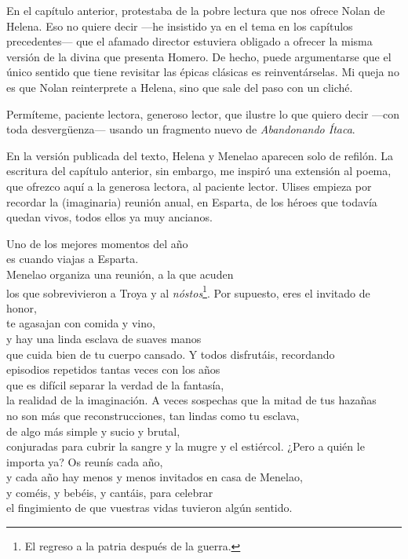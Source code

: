 \label{cap:menelao}

En el capítulo anterior, protestaba de la pobre lectura que nos ofrece Nolan de Helena. Eso no quiere decir ---he insistido ya en el tema en los capítulos precedentes--- que el afamado director estuviera obligado a ofrecer la misma versión de la divina que presenta Homero. De hecho, puede argumentarse que el único sentido que tiene revisitar las épicas clásicas es reinventárselas. Mi queja no es que Nolan reinterprete a Helena, sino que sale del paso con un cliché.

Permíteme, paciente lectora, generoso lector, que ilustre lo que quiero decir ---con toda desvergüenza--- usando un fragmento nuevo de \emph{Abandonando Ítaca}.

En la versión publicada del texto, Helena y Menelao aparecen solo de refilón. La escritura del capítulo anterior, sin embargo, me inspiró una extensión al poema, que ofrezco aquí a la generosa lectora, al paciente lector. Ulises empieza por recordar la (imaginaria) reunión anual, en Esparta, de los héroes que todavía quedan vivos, todos ellos ya muy ancianos.

\begin{versopropio}
Uno de los mejores momentos del año\\
es cuando viajas a Esparta.\\
Menelao organiza una reunión, a la que acuden\\
los que sobrevivieron a Troya y al \emph{nóstos}\footnote{El regreso a la patria después de la guerra.}.
\stanzabreak
Por supuesto, eres el invitado de honor,\\
te agasajan con comida y vino,\\
y hay una linda esclava de suaves manos\\
que cuida bien de tu cuerpo cansado.
\stanzabreak
Y todos disfrutáis, recordando\\
episodios repetidos tantas veces con los años\\
que es difícil separar la verdad de la fantasía,\\
la realidad de la imaginación.
\stanzabreak
A veces sospechas que la mitad de tus hazañas\\
no son más que reconstrucciones, tan lindas como tu esclava,\\
de algo más simple y sucio y brutal,\\
conjuradas para cubrir la sangre y la mugre y el estiércol.
\stanzabreak
¿Pero a quién le importa ya? Os reunís cada año,\\
y cada año hay menos y menos invitados en casa de Menelao,\\
y coméis, y bebéis, y cantáis, para celebrar\\
el fingimiento de que vuestras vidas tuvieron algún sentido.
\end{versopropio}

